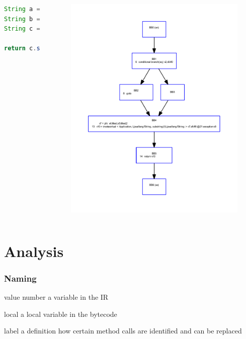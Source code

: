 \documentclass{beamer}
\begin{document}
\begin{frame}[fragile]
  \begin{columns}
    \begin{lstlisting}[language=Java]
String a = "test";
String b = "test2";		
String c = ((is) ? a:b);
		
return c.substring(9);
    \end{lstlisting}
    \begin{figure}
      \includegraphics[scale=0.5]{irExample.pdf}
    \end{figure}
  \end{columns}
\end{frame}

\section{Analysis}

\frame{\sectionpage}

\begin{frame}
   \frametitle{Naming}
   \begin{block}{value number}
	   a variable in the IR
   \end{block}

	\begin{block}{local}
		a local variable in the bytecode
	\end{block}

	\begin{block}{label}
    a definition how certain method calls are identified and can be replaced
	\end{block}

\end{frame}
\end{document}
